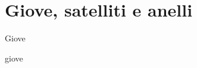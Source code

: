 \section{Giove, satelliti e anelli}

\begin{frame}{Giove}


\end{frame}

\begin{wordonframe}{giove}


\end{wordonframe}

